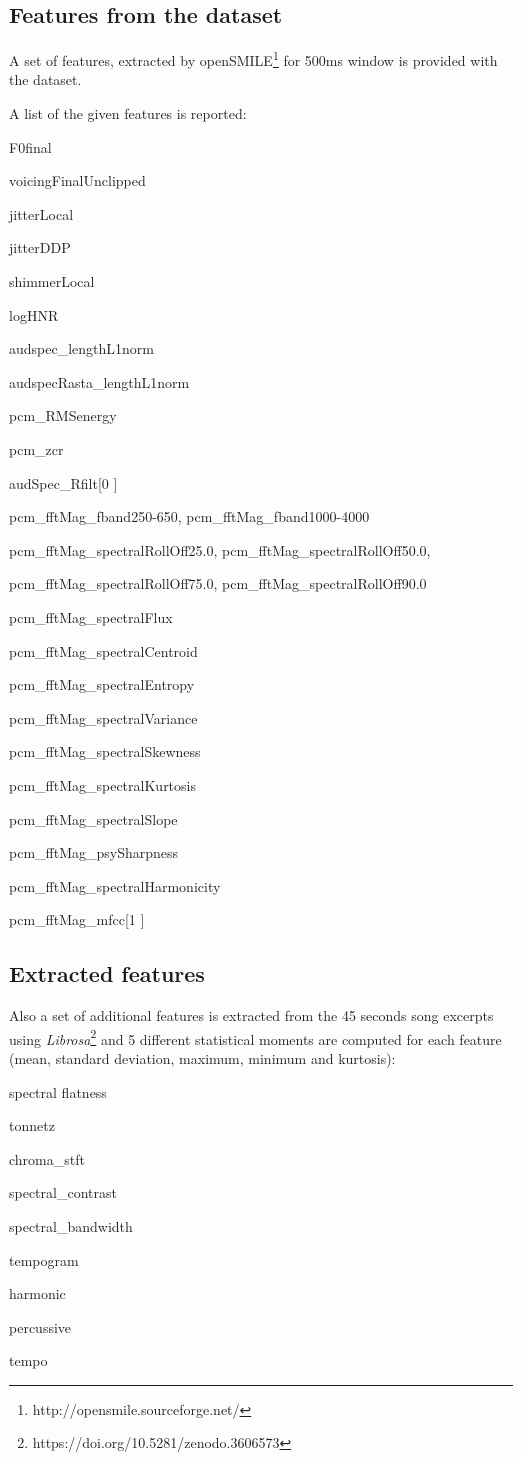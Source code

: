 \subsection{Features from the dataset}

A set of features, extracted by openSMILE\footnote{http://opensmile.sourceforge.net/} for 500ms window is provided with the dataset. 

A list of the given features is reported:\newline

F0final

voicingFinalUnclipped

jitterLocal

jitterDDP

shimmerLocal

logHNR

audspec\_lengthL1norm

audspecRasta\_lengthL1norm

pcm\_RMSenergy

pcm\_zcr

audSpec\_Rfilt[0 ]

pcm\_fftMag\_fband250-650, pcm\_fftMag\_fband1000-4000

pcm\_fftMag\_spectralRollOff25.0, pcm\_fftMag\_spectralRollOff50.0, 

pcm\_fftMag\_spectralRollOff75.0, pcm\_fftMag\_spectralRollOff90.0

pcm\_fftMag\_spectralFlux

pcm\_fftMag\_spectralCentroid

pcm\_fftMag\_spectralEntropy

pcm\_fftMag\_spectralVariance

pcm\_fftMag\_spectralSkewness

pcm\_fftMag\_spectralKurtosis

pcm\_fftMag\_spectralSlope

pcm\_fftMag\_psySharpness

pcm\_fftMag\_spectralHarmonicity

pcm\_fftMag\_mfcc[1 ] \newline


\subsection{Extracted features}

Also a set of additional features is extracted  from the 45 seconds song excerpts using \emph{Librosa}\footnote{https://doi.org/10.5281/zenodo.3606573} and 5 different statistical moments are computed for each feature (mean, standard deviation, maximum, minimum and kurtosis):\newline

spectral flatness

tonnetz

chroma\_stft

spectral\_contrast

spectral\_bandwidth

tempogram

harmonic

percussive

tempo

